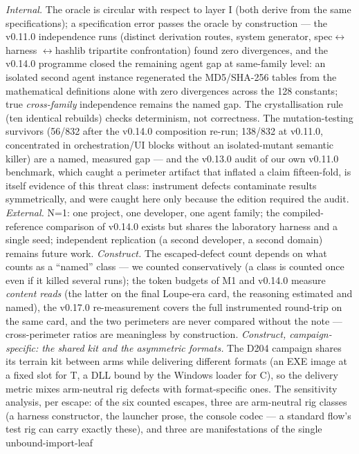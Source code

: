 \documentclass[11pt,a4paper]{article}
\begin{document}
\emph{Internal.} The oracle is circular with respect to layer I
(both derive from the same specifications); a specification error passes
the oracle by construction --- the v0.11.0 independence runs (distinct
derivation routes, system generator, spec$\leftrightarrow$\allowbreak harness
$\leftrightarrow$\allowbreak hashlib tripartite confrontation) found zero
divergences, and the v0.14.0 programme closed the remaining agent gap
at same-family level: an isolated second agent instance regenerated the
MD5/SHA-256 tables from the mathematical definitions alone with zero
divergences across the 128 constants; true \emph{cross-family}
independence remains the named gap. The crystallisation rule (ten
identical rebuilds) checks
determinism, not correctness. The mutation-testing survivors (56/832
after the v0.14.0 composition re-run; 138/832 at v0.11.0,
concentrated in orchestration/UI blocks without an isolated-mutant
semantic killer) are a named, measured gap --- and the v0.13.0 audit of
our own v0.11.0 benchmark, which caught a perimeter artifact that
inflated a claim fifteen-fold, is itself evidence of this threat class:
instrument defects contaminate results symmetrically, and were caught
here only because the edition required the audit. \emph{External.} N=1: one
project, one developer, one agent family; the compiled-reference
comparison of v0.14.0 exists but shares the laboratory harness and a
single seed; independent replication (a second developer, a second
domain) remains future work. \emph{Construct.} The
escaped-defect count depends on what counts as a ``named'' class --- we
counted conservatively (a class is counted once even if it killed several
runs); the token budgets of M1 and v0.14.0 measure \emph{content reads}
(the latter on the final Loupe-era card, the reasoning estimated and
named), the v0.17.0 re-measurement covers the full instrumented
round-trip on the same card, and the two perimeters are never compared
without the note --- cross-perimeter ratios are meaningless by
construction.
\emph{Construct, campaign-specific: the shared kit and the asymmetric
formats.} The D204 campaign shares its terrain kit between arms while
delivering different formats (an EXE image at a fixed slot for T, a DLL
bound by the Windows loader for C), so the delivery metric mixes
arm-neutral rig defects with format-specific ones. The sensitivity
analysis, per escape: of the six counted escapes, three are
arm-neutral rig classes (a harness constructor, the launcher prose,
the console codec --- a standard flow's test rig can carry exactly
these), and three are manifestations of the single unbound-import-leaf
\end{document}
